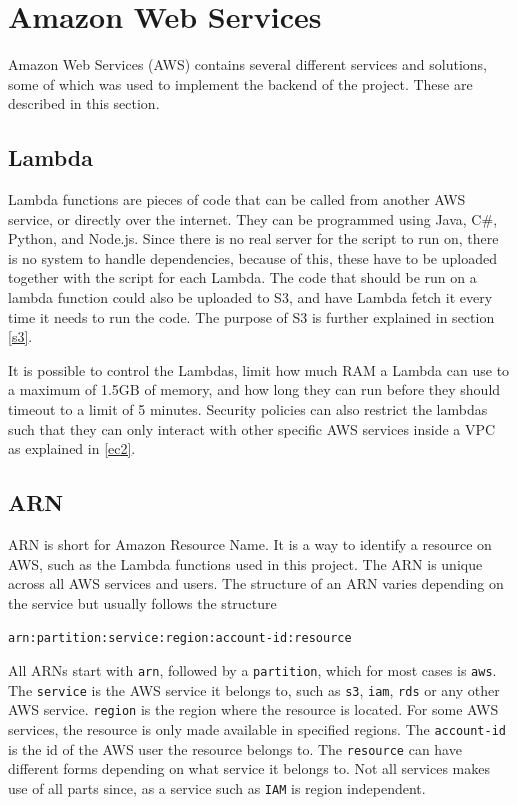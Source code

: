 \section{Amazon Web Services}\label{sec:aws}
Amazon Web Services (AWS) contains several different services and solutions, some of which was used to implement the backend of the project. These are described in this section.

\subsection{Lambda}
Lambda functions are pieces of code that can be called from another AWS service, or directly over the internet. They can be programmed using Java, C\#, Python, and Node.js. Since there is no real server for the script to run on, there is no system to handle dependencies, because of this, these have to be uploaded together with the script for each Lambda. The code that should be run on a lambda function could also be uploaded to S3, and have Lambda fetch it every time it needs to run the code. The purpose of S3 is further explained in section \ref{s3}.

It is possible to control the Lambdas, limit how much RAM a Lambda can use to a maximum of 1.5GB of memory, and how long they can run before they should timeout to a limit of 5 minutes. Security policies can also restrict the lambdas such that they can only interact with other specific AWS services inside a VPC as explained in \ref{ec2}. 

\subsection{ARN}
ARN is short for Amazon Resource Name. It is a way to identify a resource on AWS, such as the Lambda functions used in this project. The ARN is unique across all AWS services and users. The structure of an ARN varies depending on the service but usually follows the structure

\texttt{arn:partition:service:region:account-id:resource}

All ARNs start with \texttt{arn}, followed by a \texttt{partition}, which for most cases is \texttt{aws}. The \texttt{service} is the AWS service it belongs to, such as \texttt{s3}, \texttt{iam}, \texttt{rds} or any other AWS service. \texttt{region} is the region where the resource is located. For some AWS services, the resource is only made available in specified regions. The \texttt{account-id} is the id of the AWS user the resource belongs to. The \texttt{resource} can have different forms depending on what service it belongs to. Not all services makes use of all parts since, as a service such as \texttt{IAM} is region independent.

